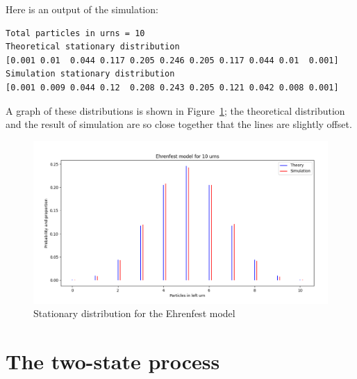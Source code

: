 \documentclass[11pt,a4paper]{article}
\begin{document}
Here is an output of the simulation:
\begin{verbatim}
Total particles in urns = 10
Theoretical stationary distribution
[0.001 0.01  0.044 0.117 0.205 0.246 0.205 0.117 0.044 0.01  0.001]
Simulation stationary distribution
[0.001 0.009 0.044 0.12  0.208 0.243 0.205 0.121 0.042 0.008 0.001]
\end{verbatim}
A graph of these distributions is shown in Figure~\ref{f.ehrenfest1}; the theoretical distribution and the result of simulation are so close together that the lines are slightly offset.

\begin{figure}
\begin{center}
\includegraphics[width=\textwidth]{ehrenfest-01}
\caption{Stationary distribution for the Ehrenfest model}\label{f.ehrenfest1}
\end{center}
\end{figure}


\section{The two-state process}\label{s.two-state}
\end{document}
